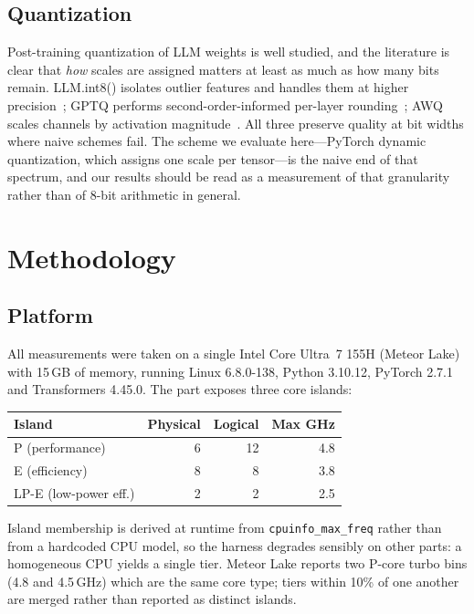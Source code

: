 \documentclass[journal]{IEEEtran}
\begin{document}
\subsection{Quantization}
Post-training quantization of LLM weights is well studied, and the literature
is clear that \emph{how} scales are assigned matters at least as much as how
many bits remain. LLM.int8() isolates outlier features and handles them at
higher precision~\cite{dettmers2022llmint8}; GPTQ performs
second-order-informed per-layer rounding~\cite{frantar2023gptq}; AWQ scales
channels by activation magnitude~\cite{lin2024awq}. All three preserve quality
at bit widths where naive schemes fail. The scheme we evaluate here---PyTorch
dynamic quantization, which assigns one scale per tensor---is the naive end of
that spectrum, and our results should be read as a measurement of that
granularity rather than of 8-bit arithmetic in general.

\section{Methodology}
\label{sec:method}

\subsection{Platform}
All measurements were taken on a single Intel Core Ultra~7 155H (Meteor Lake)
with 15\,GB of memory, running Linux 6.8.0-138, Python 3.10.12, PyTorch 2.7.1
and Transformers 4.45.0. The part exposes three core islands:

\begin{center}
\begin{tabular}{lrrr}
\toprule
Island & Physical & Logical & Max GHz \\
\midrule
P (performance)       & 6 & 12 & 4.8 \\
E (efficiency)        & 8 &  8 & 3.8 \\
LP-E (low-power eff.) & 2 &  2 & 2.5 \\
\bottomrule
\end{tabular}
\end{center}

\noindent Island membership is derived at runtime
from \texttt{cpuinfo\_max\_freq} rather than from a hardcoded CPU model, so the
harness degrades sensibly on other parts: a homogeneous CPU yields a single
tier. Meteor Lake reports two P-core turbo bins (4.8 and 4.5\,GHz) which are
the same core type; tiers within 10\% of one another are merged rather than
reported as distinct islands.
\end{document}
